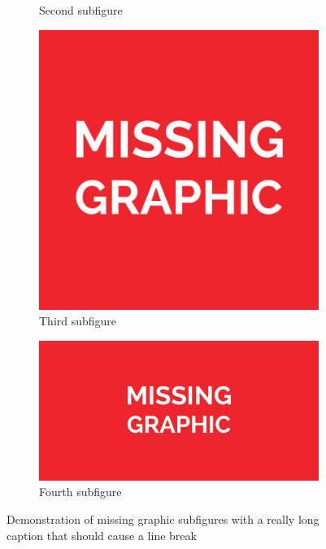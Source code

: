\begin{figure}
\begin{subfigure}{0.28\textwidth}
        \caption{Second subfigure}
    \end{subfigure}
    \begin{subfigure}{0.28\textwidth}
        \includegraphics[width=\textwidth] {media/missing-graphic-square.pdf}
        \caption{Third subfigure}
    \end{subfigure}

    \begin{subfigure}{0.855\textwidth}
        \includegraphics[width=\textwidth] {media/missing-graphic-rectangle.pdf}
        \caption{Fourth subfigure}
    \end{subfigure}

    \caption{Demonstration of missing graphic subfigures with a really long caption that should cause a line break}
    \label{missing-graphic-subfigures-example}
\end{figure}

